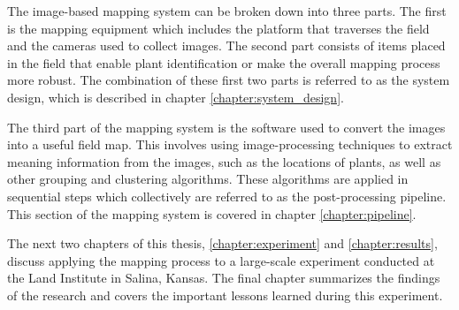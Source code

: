 The image-based mapping system can be broken down into three parts.  The first is the mapping equipment which includes the platform that traverses the field and the cameras used to collect images.  The second part consists of items placed in the field that enable plant identification or make the overall mapping process more robust.  The combination of these first two parts is referred to as the system design, which is described in chapter \ref{chapter:system_design}. 

The third part of the mapping system is the software used to convert the images into a useful field map.  This involves using image-processing techniques to extract meaning information from the images, such as the locations of plants, as well as other grouping and clustering algorithms.  These algorithms are applied in sequential steps which collectively are referred to as the post-processing pipeline.  This section of the mapping system is covered in chapter \ref{chapter:pipeline}. 

The next two chapters of this thesis, \ref{chapter:experiment} and \ref{chapter:results}, discuss applying the mapping process to a large-scale experiment conducted at the Land Institute in Salina, Kansas.  The final chapter summarizes the findings of the research and covers the important lessons learned during this experiment.
